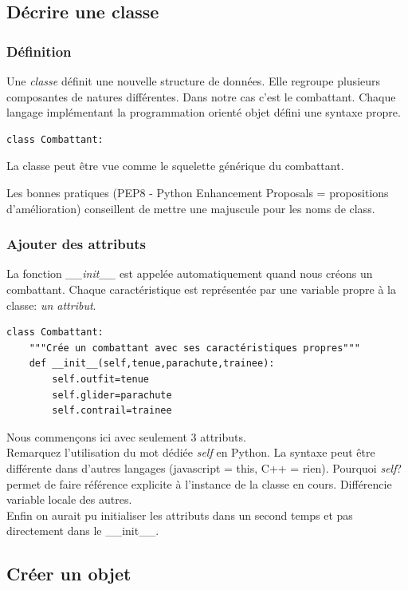 \documentclass[a4paper,11pt]{article}
\begin{document}
\begin{Form}
\subsection{Décrire une classe}
\subsubsection{Définition}
Une \emph{classe} définit une nouvelle structure de données. Elle regroupe plusieurs composantes de natures différentes. Dans notre cas c'est le combattant. Chaque langage implémentant la programmation orienté objet défini une syntaxe propre. 
\begin{lstlisting}
class Combattant:
\end{lstlisting}
La classe peut être vue comme le squelette générique du combattant.
\begin{commentprof}
Les bonnes pratiques (PEP8 - Python Enhancement Proposals = propositions d'amélioration) conseillent de mettre une majuscule pour les noms de class.
\end{commentprof}
\subsubsection{Ajouter des attributs}
La fonction \emph{\_\_init\_\_} est appelée automatiquement quand nous créons un combattant. Chaque caractéristique est représentée par une variable propre à la classe: \emph{un attribut}.
\begin{lstlisting}
class Combattant:
	"""Crée un combattant avec ses caractéristiques propres"""
	def __init__(self,tenue,parachute,trainee):
		self.outfit=tenue
		self.glider=parachute
		self.contrail=trainee
\end{lstlisting}
\begin{commentprof}
Nous commençons ici avec seulement 3 attributs.\\
Remarquez l'utilisation du mot dédiée \emph{self} en Python. La syntaxe peut être différente dans d'autres langages (javascript = this, C++ = rien). Pourquoi \emph{self}? permet de faire référence explicite à l'instance de la classe en cours. Différencie variable locale des autres.\\Enfin on aurait pu initialiser les attributs dans un second temps et pas directement dans le \_\_init\_\_.
\end{commentprof}
\subsection{Créer un objet}

\end{Form}
\end{document}
